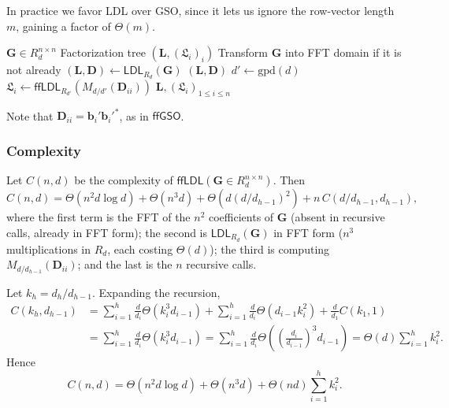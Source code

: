 In practice we favor LDL over GSO, since it lets us ignore the row-vector length $m$, gaining a factor of $\Theta(m)$.

\begin{algorithm}[H]
	\caption{$\mathsf{ffLDL}(\mathbf{G} \in R_d^{n \times n})$}
	\label{alg:ffldl}
	\begin{algorithmic}[1]
		\Require $\mathbf{G} \in R_d^{n \times n}$
		\Ensure Factorization tree $(\mathbf{L}, (\mathfrak{L}_i)_i)$
		\State Transform $\mathbf{G}$ into FFT domain if it is not already
		\State $(\mathbf{L}, \mathbf{D}) \gets \mathsf{LDL}_{R_d}(\mathbf{G})$
			\State \Return $(\mathbf{L}, \mathbf{D})$
		\EndIf
		\State $d' \gets \mathrm{gpd}(d)$
			\State $\mathfrak{L}_i \gets \mathsf{ffLDL}_{R_{d'}}(M_{d/d'}(\mathbf{D}_{ii}))$
		\EndFor
		\State \Return $\mathbf{L}, (\mathfrak{L}_i)_{1 \leq i \leq n}$
	\end{algorithmic}
\end{algorithm}

Note that $\mathbf{D}_{ii} = \mathbf{b}_i' \mathbf{b}_i'^*$, as in $\mathsf{ffGSO}$.

\subsubsection{Complexity}

Let $C(n,d)$ be the complexity of $\mathsf{ffLDL}(\mathbf{G} \in R_d^{n \times n})$. Then
\[
	C(n,d) = \Theta(n^2 d \log d) + \Theta(n^3 d) + \Theta(d(d/d_{h-1})^2) + n \, C(d/d_{h-1}, d_{h-1}),
\]
where the first term is the FFT of the $n^2$ coefficients of $\mathbf{G}$ (absent in recursive calls, already in FFT form); the second is $\mathsf{LDL}_{R_d}(\mathbf{G})$ in FFT form ($n^3$ multiplications in $R_d$, each costing $\Theta(d)$); the third is computing $M_{d/d_{h-1}}(\mathbf{D}_{ii})$; and the last is the $n$ recursive calls.

Let $k_h = d_h/d_{h-1}$. Expanding the recursion,
\begin{align*}
	C(k_h, d_{h-1}) &= \sum_{i=1}^h \frac{d}{d_i} \Theta(k_i^3 d_{i-1}) + \sum_{i=1}^h \frac{d}{d_i} \Theta(d_{i-1} k_i^2) + \frac{d}{d_1} C(k_1, 1) \\
	&= \sum_{i=1}^h \frac{d}{d_i} \Theta(k_i^3 d_{i-1}) = \sum_{i=1}^h \frac{d}{d_i} \Theta\!\left( \left( \frac{d_i}{d_{i-1}} \right)^3 d_{i-1} \right) = \Theta(d) \sum_{i=1}^h k_i^2.
\end{align*}
Hence
\[
	C(n,d) = \Theta(n^2 d \log d) + \Theta(n^3 d) + \Theta(nd) \sum_{i=1}^h k_i^2.
\]

